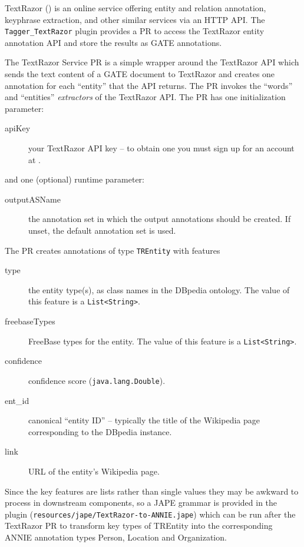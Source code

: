 TextRazor () is an online service
offering entity and relation annotation, keyphrase extraction, and other
similar services via an HTTP API.  The \verb!Tagger_TextRazor! plugin provides
a PR to access the TextRazor entity annotation API and store the results as
GATE annotations.

The TextRazor Service PR is a simple wrapper around the TextRazor API which
sends the text content of a GATE document to TextRazor and creates one
annotation for each ``entity'' that the API returns.  The PR invokes the
``words'' and ``entities'' \emph{extractors} of the TextRazor API.  The PR has
one initialization parameter:
\begin{description}
\item[apiKey] your TextRazor API key -- to obtain one you must sign up for an
  account at .
\end{description}

and one (optional) runtime parameter:
\begin{description}
\item[outputASName] the annotation set in which the output annotations should
  be created.  If unset, the default annotation set is used.
\end{description}

The PR creates annotations of type \verb!TREntity! with features
\begin{description}
\item[type] the entity type(s), as class names in the DBpedia ontology.  The
  value of this feature is a \verb!List<String>!.
\item[freebaseTypes] FreeBase types for the entity.  The value of this feature
  is a \verb!List<String>!.
\item[confidence] confidence score (\verb!java.lang.Double!).
\item[ent\_id] canonical ``entity ID'' -- typically the title of the Wikipedia
  page corresponding to the DBpedia instance.
\item[link] URL of the entity's Wikipedia page.
\end{description}

Since the key features are lists rather than single values they may be awkward
to process in downstream components, so a JAPE grammar is provided in the
plugin (\verb!resources/jape/TextRazor-to-ANNIE.jape!) which can be run after
the TextRazor PR to transform key types of TREntity into the corresponding
ANNIE annotation types Person, Location and Organization.

